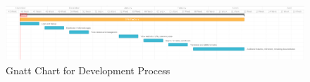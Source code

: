 \begin{figure}
\begin{center}
\includegraphics[width=15cm]{figures/agile}
\end{center}
\caption{Gnatt Chart for Development Process}
\label{fig:cicd_build_duration}
\end{figure}
